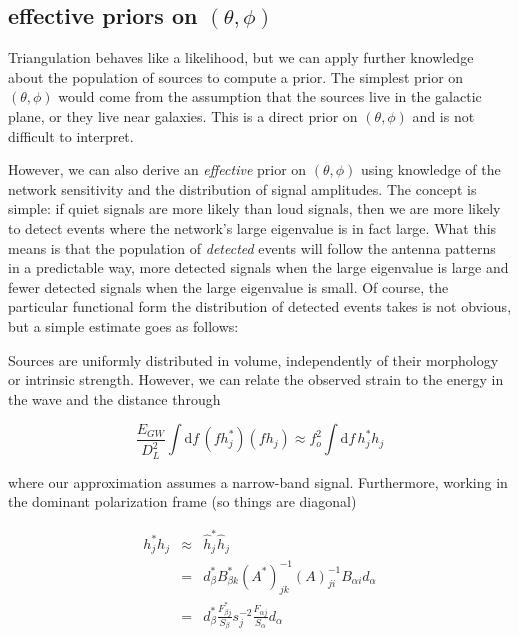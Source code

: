 \documentclass[10pt]{article}
\begin{document}
\subsection{effective priors on $(\theta,\phi)$}

Triangulation behaves like a likelihood, but we can apply further knowledge about the population of sources to compute a prior. The simplest prior on $(\theta,\phi)$ would come from the assumption that the sources live in the galactic plane, or they live near galaxies. This is a direct prior on $(\theta,\phi)$ and is not difficult to interpret.

However, we can also derive an \emph{effective} prior on $(\theta,\phi)$ using knowledge of the network sensitivity and the distribution of signal amplitudes. The concept is simple: if quiet signals are more likely than loud signals, then we are more likely to detect events where the network's large eigenvalue is in fact large. What this means is that the population of \emph{detected} events will follow the antenna patterns in a predictable way, more detected signals when the large eigenvalue is large and fewer detected signals when the large eigenvalue is small. Of course, the particular functional form the distribution of detected events takes is not obvious, but a simple estimate goes as follows:

Sources are uniformly distributed in volume, independently of their morphology or intrinsic strength. However, we can relate the observed strain to the energy in the wave and the distance through

\begin{equation}
\frac{E_{GW}}{D_L^2} \int\mathrm{d}f\, (f h_{j}^\ast)(f h_{j}) \approx f_o^2 \int\mathrm{d}f\, h_{j}^\ast h_{j}
\end{equation}

where our approximation assumes a narrow-band signal. Furthermore, working in the dominant polarization frame (so things are diagonal)

\begin{eqnarray}
h_{j}^\ast h_{j} & \approx & \hat{h}_j^\ast \hat{h}_j \\
                 & = & d_\beta^\ast B_{\beta k}^\ast \left(A^\ast\right)_{jk}^{-1} \left(A\right)_{ji}^{-1} B_{\alpha i} d_\alpha \\
                 & = & d_\beta^\ast \frac{F_{\beta j}^\ast}{S_\beta} s_j^{-2} \frac{F_{\alpha j}}{S_\alpha} d_\alpha \\
\end{eqnarray}
\end{document}
